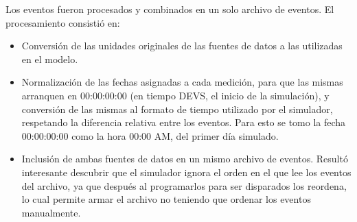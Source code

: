  Los eventos fueron procesados y combinados en un solo archivo de eventos. El procesamiento consistió en:
 \begin{itemize}
     \item Conversión de las unidades originales de las fuentes de datos a las utilizadas en el modelo.
     \item Normalización de las fechas asignadas a cada medición, para que las mismas arranquen en 00:00:00:00 (en tiempo DEVS, el inicio de la simulación), y conversión de las mismas al formato de tiempo utilizado por el simulador, respetando la diferencia relativa entre los eventos. Para esto se tomo la fecha 00:00:00:00 como la hora 00:00 AM, del primer día simulado.
     \item Inclusión de ambas fuentes de datos en un mismo archivo de eventos. Resultó interesante descubrir que el simulador ignora el orden en el que lee los eventos del archivo, ya que después al programarlos para ser disparados los reordena, lo cual permite armar el archivo no teniendo que ordenar los eventos manualmente.
     
 \end{itemize}
